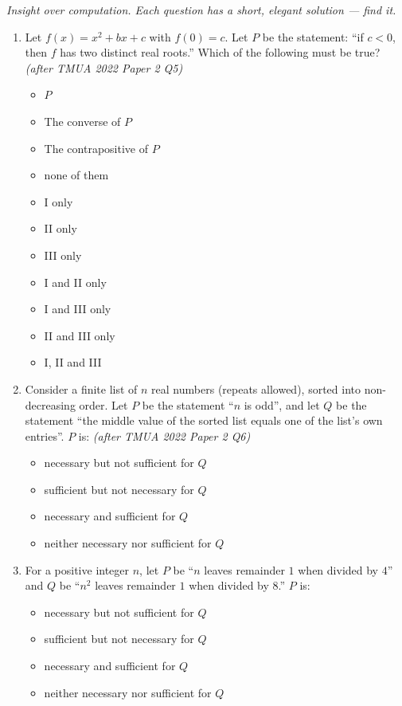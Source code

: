 \documentclass[11pt,a4paper]{article}
\begin{document}
\noindent\textit{Insight over computation. Each question has a short, elegant solution --- find it.}

\begin{enumerate}

\item Let $f(x)=x^2+bx+c$ with $f(0)=c$. Let $P$ be the statement: ``if $c<0$, then $f$ has two distinct real roots.'' Which of the following must be true? \textit{\small(after TMUA 2022 Paper 2 Q5)}
\begin{itemize}
\item[I.] $P$
\item[II.] The converse of $P$
\item[III.] The contrapositive of $P$
\end{itemize}
\begin{itemize}
\item[A)] none of them
\item[B)] I only
\item[C)] II only
\item[D)] III only
\item[E)] I and II only
\item[F)] I and III only
\item[G)] II and III only
\item[H)] I, II and III
\end{itemize}

\item Consider a finite list of $n$ real numbers (repeats allowed), sorted into non-decreasing order. Let $P$ be the statement ``$n$ is odd'', and let $Q$ be the statement ``the middle value of the sorted list equals one of the list's own entries''. $P$ is: \textit{\small(after TMUA 2022 Paper 2 Q6)}
\begin{itemize}
\item[A)] necessary but not sufficient for $Q$
\item[B)] sufficient but not necessary for $Q$
\item[C)] necessary and sufficient for $Q$
\item[D)] neither necessary nor sufficient for $Q$
\end{itemize}

\item For a positive integer $n$, let $P$ be ``$n$ leaves remainder $1$ when divided by $4$'' and $Q$ be ``$n^2$ leaves remainder $1$ when divided by $8$.'' $P$ is:
\begin{itemize}
\item[A)] necessary but not sufficient for $Q$
\item[B)] sufficient but not necessary for $Q$
\item[C)] necessary and sufficient for $Q$
\item[D)] neither necessary nor sufficient for $Q$
\end{itemize}


\end{enumerate}
\end{document}
